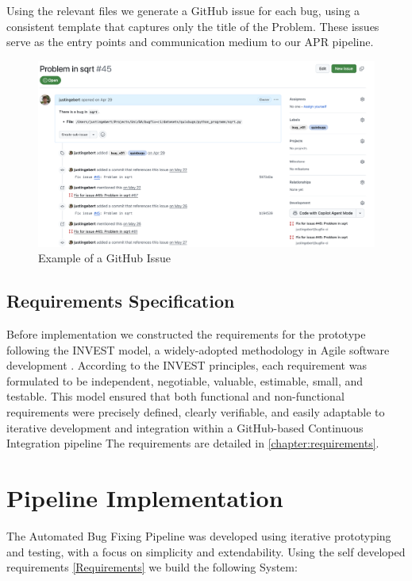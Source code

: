 Using the relevant files we generate a GitHub issue for each bug, using a consistent template that captures only the title of the Problem. These issues serve as the entry points and communication medium to our APR pipeline.

\begin{figure}[H]
    \centering
    \includegraphics[width=1\textwidth]{images/github/GitHub Issue.png}
    \caption{Example of a GitHub Issue}
    \label{fig:gh-issue2}
\end{figure}

\subsection{Requirements Specification}

Before implementation we constructed the requirements for the prototype following the INVEST model, a widely-adopted methodology in Agile software development \cite{10.5555/984017}. According to the INVEST principles, each requirement was formulated to be independent, negotiable, valuable, estimable, small, and testable. This model ensured that both functional and non-functional requirements were precisely defined, clearly verifiable, and easily adaptable to iterative development and integration within a GitHub-based Continuous Integration pipeline
The requirements are detailed in \ref{chapter:requirements}.
\section{Pipeline Implementation}
The Automated Bug Fixing Pipeline was developed using iterative prototyping and testing, with a focus on simplicity and extendability. Using the self developed requirements \ref{Requirements} we build the following System:

